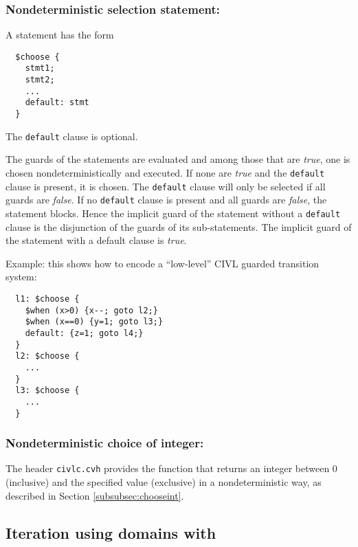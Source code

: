 \subsubsection{Nondeterministic selection statement: \cchoose}

A \cchoose{} statement has the form
\begin{verbatim}
  $choose {
    stmt1;
    stmt2;
    ...
    default: stmt
  }
\end{verbatim}
The \texttt{default} clause is optional.

The guards of the statements are evaluated and among those that are
\emph{true}, one is chosen nondeterministically and executed.  If none
are \emph{true} and the \texttt{default} clause is present, it is
chosen.  The \texttt{default} clause will only be selected if all
guards are \emph{false}.  If no \texttt{default} clause is present and
all guards are \emph{false}, the statement blocks.  Hence the implicit
guard of the \cchoose{} statement without a \texttt{default} clause is
the disjunction of the guards of its sub-statements.  The implicit
guard of the \cchoose{} statement with a default clause is
\emph{true}.

Example: this shows how to encode a ``low-level'' CIVL guarded
transition system:

\begin{verbatim}
  l1: $choose {
    $when (x>0) {x--; goto l2;}
    $when (x==0) {y=1; goto l3;}
    default: {z=1; goto l4;}
  }
  l2: $choose {
    ...
  }
  l3: $choose {
    ...
  }
\end{verbatim}


\subsubsection{Nondeterministic choice of integer:
  \texorpdfstring{\cchooseint}{\$choose\_int}}
The header \texttt{civlc.cvh} provides the function \cchooseint{} that returns an integer between 0 (inclusive) and the specified value (exclusive)  in a nondeterministic way, as described in Section \ref{subsubsec:chooseint}.

\subsection{Iteration using domains with \cfor}
\label{sec:cfor}

